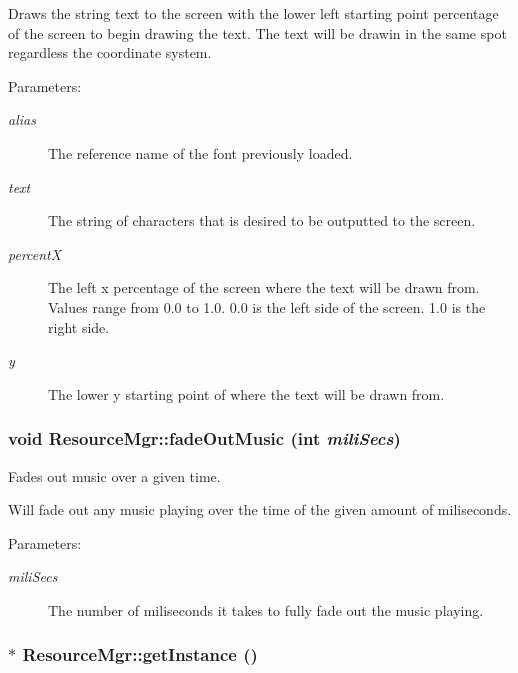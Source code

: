 Draws the string text to the screen with the lower left starting point percentage of the screen to begin drawing the text. The text will be drawin in the same spot regardless the coordinate system. \begin{Desc}
\item[Parameters:]
\begin{description}
\item[{\em alias}]The reference name of the font previously loaded. \item[{\em text}]The string of characters that is desired to be outputted to the screen. \item[{\em percentX}]The left x percentage of the screen where the text will be drawn from. Values range from 0.0 to 1.0. 0.0 is the left side of the screen. 1.0 is the right side. \item[{\em y}]The lower y starting point of where the text will be drawn from. \end{description}
\end{Desc}
\hypertarget{class_resource_mgr_cdafe80888ac74a8eee3665b3cc31029}{
\subsubsection[{fadeOutMusic}]{\setlength{\rightskip}{0pt plus 5cm}void ResourceMgr::fadeOutMusic (int {\em miliSecs})}}
\label{class_resource_mgr_cdafe80888ac74a8eee3665b3cc31029}


Fades out music over a given time. 

Will fade out any music playing over the time of the given amount of miliseconds. \begin{Desc}
\item[Parameters:]
\begin{description}
\item[{\em miliSecs}]The number of miliseconds it takes to fully fade out the music playing. \end{description}
\end{Desc}
\hypertarget{class_resource_mgr_ec5d2a10ae64caa3ad718ba9881acd0a}{
\subsubsection[{getInstance}]{ $\ast$ ResourceMgr::getInstance ()}}
\label{class_resource_mgr_ec5d2a10ae64caa3ad718ba9881acd0a}


